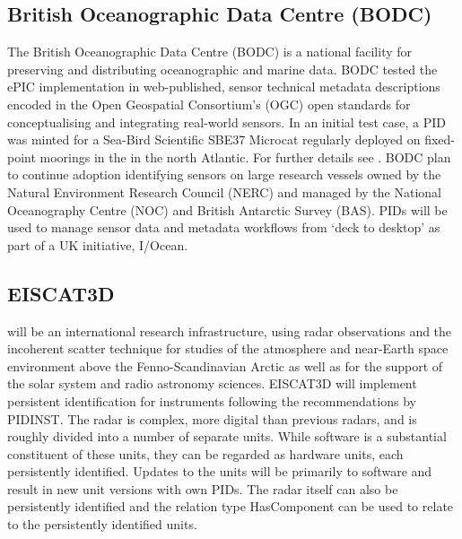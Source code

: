 \documentclass[a4paper,10pt,english]{sphinxmanual}
\begin{document}
\subsection{British Oceanographic Data Centre (BODC)}
\label{\detokenize{white-paper/adoption:british-oceanographic-data-centre-bodc}}
The British Oceanographic Data Centre (BODC) is a national facility for
preserving and distributing oceanographic and marine data. BODC tested
the ePIC implementation in web-published, sensor technical metadata
descriptions encoded in the Open Geospatial Consortium’s (OGC)
 open standards for conceptualising and integrating
real-world sensors. In an initial test case, a PID was minted for a
Sea-Bird Scientific SBE37 Microcat regularly deployed on fixed-point
moorings in the  in the north Atlantic. For further details see
{\hyperref[\detokenize{white-paper/landing-page-encoding:landing-page-encoding-swe}]{}}. BODC plan to continue adoption
identifying sensors on large research vessels owned by the Natural
Environment Research Council (NERC) and managed by the National
Oceanography Centre (NOC) and British Antarctic Survey (BAS). PIDs will
be used to manage sensor data and metadata workflows from ‘deck to
desktop’ as part of a UK initiative, I/Ocean.


\subsection{EISCAT3D}
\label{\detokenize{white-paper/adoption:eiscat3d}}
 will be an international research infrastructure, using
radar observations and the incoherent scatter technique for studies of
the atmosphere and near-Earth space environment above the
Fenno-Scandinavian Arctic as well as for the support of the solar system
and radio astronomy sciences. EISCAT3D will implement persistent
identification for instruments following the recommendations by PIDINST.
The radar is complex, more digital than previous radars, and is roughly
divided into a number of separate units. While software is a substantial
constituent of these units, they can be regarded as hardware units, each
persistently identified. Updates to the units will be primarily to
software and result in new unit versions with own PIDs. The radar itself
can also be persistently identified and the relation type HasComponent
can be used to relate to the persistently identified units.
\end{document}
